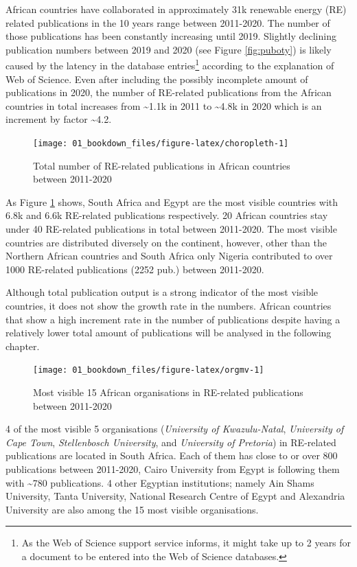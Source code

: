 \documentclass[
]{book}
\begin{document}
African countries have collaborated in approximately 31k renewable energy (RE) related publications in the 10 years range between 2011-2020. The number of those publications has been constantly
increasing until 2019. Slightly declining publication numbers between 2019
and 2020 (see Figure \ref{fig:puboty})
is likely caused by the latency in the database entries\footnote{As the Web of Science support service informs, it might take up to 2 years for a document to be entered into the Web of Science databases.} according to the explanation of Web of Science. Even after including the
possibly incomplete amount of publications in 2020, the number of RE-related publications from
the African countries in total increases from \textasciitilde1.1k in 2011 to \textasciitilde4.8k in
2020 which is an increment by factor \textasciitilde4.2.

\begin{figure}
\texttt{[image: 01\_bookdown\_files/figure-latex/choropleth-1]} \caption{Total number of RE-related publications in African countries between 2011-2020}\label{fig:choropleth}
\end{figure}

As Figure \ref{fig:choropleth} shows, South Africa and Egypt are the most visible countries with 6.8k and 6.6k RE-related publications respectively. 20 African countries stay under 40 RE-related
publications in total between 2011-2020. The most visible countries are distributed diversely on the continent, however, other than the Northern African countries and South Africa only Nigeria contributed to over 1000 RE-related publications (2252 pub.) between 2011-2020.

Although total publication output is a strong indicator of the most visible countries, it does not show the growth rate in the numbers. African countries that show a high increment rate in the number of publications despite having a relatively lower total amount of publications will be analysed in the following chapter.

\begin{figure}
\texttt{[image: 01\_bookdown\_files/figure-latex/orgmv-1]} \caption{Most visible 15 African organisations in RE-related publications between 2011-2020}\label{fig:orgmv}
\end{figure}

4 of the most visible 5 organisations (\emph{University of Kwazulu-Natal}, \emph{University of Cape Town}, \emph{Stellenbosch University}, and \emph{University of Pretoria}) in RE-related publications are located in South Africa. Each of them has close to or over 800 publications between 2011-2020, Cairo University from Egypt is following them with \textasciitilde780 publications. 4 other Egyptian institutions; namely Ain Shams University, Tanta University, National Research Centre of Egypt and Alexandria University are also among the 15 most visible organisations.
\end{document}
